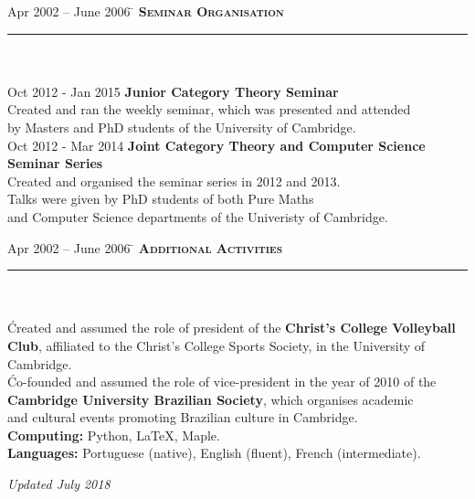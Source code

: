 \documentclass[11pt,a4paper]{article}
\begin{document}


\begin{tabbing}
Apr 2002 -- June 2006 \=\kill
\> \textbf{\Large{\textsc{Seminar Organisation}}} \\
\> \noindent\rule{11cm}{1pt}\\
\> \\
\> Oct 2012 - Jan 2015 \' \textbf{Junior Category Theory Seminar} \\
\> Created and ran the weekly seminar, which was presented and attended  \\ \> by Masters and PhD students of the University of Cambridge.\\ [2mm] 
\> Oct 2012 - Mar 2014 \' \textbf{Joint Category Theory and Computer Science Seminar Series}\\ 
\> Created and organised the seminar series in 2012 and 2013. \\ 
\> Talks were given by PhD students of both Pure Maths \\ \> and Computer Science departments of the Univeristy of Cambridge.\\  
\end{tabbing}

\newpage 
\begin{tabbing}
Apr 2002 -- June 2006 \=\kill
\> \textbf{\large{\textsc{Additional Activities}}} \\
\> \noindent\rule{11cm}{1pt}\\
\\
  \' Created and assumed the role of president of the \textbf{Christ's College Volleyball} \\ 
\> \textbf{Club}, affiliated to the Christ's College Sports Society, in the University of \\ \> Cambridge. \\ [2mm]
 \' Co-founded and assumed the role of vice-president in the year of 2010
of the \\ \> \textbf{Cambridge University Brazilian Society}, which organises academic \\ 
\>and cultural events promoting Brazilian culture in Cambridge. \\ [5mm]
\> \textbf{Computing:} Python, \LaTeX, Maple. \\ 
\> \textbf{Languages:} Portuguese (native), English (fluent), French (intermediate). \\  
\end{tabbing}
\vspace*{\fill}
\hspace{3.5cm} \textit{Updated July 2018}
\end{document}
